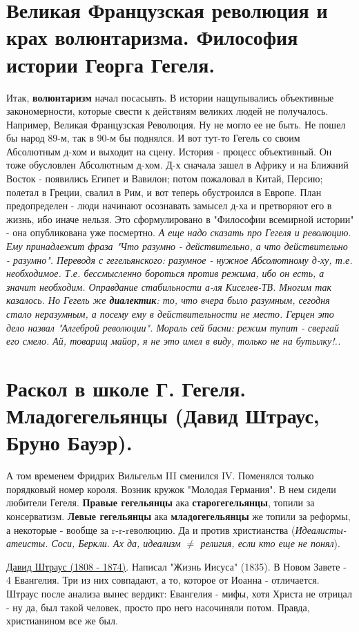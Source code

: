 \section{Великая Французская революция и крах волюнтаризма.  Философия истории Георга Гегеля. }
Итак, \textbf{волюнтаризм} начал посасывть. В истории нащупывались объективные закономерности, которые свести к действиям великих людей не получалось. Например, Великая Французская Революция. Ну не могло ее не быть. Не пошел бы народ 89-м, так в 90-м бы поднялся. И вот тут-то Гегель со своим Абсолютным д-хом и выходит на сцену. История - процесс объективный. Он тоже обусловлен Абсолютным д-хом. Д-х сначала зашел в Африку и на Ближний Восток - появились Египет и Вавилон; потом пожаловал в Китай, Персию; полетал в Греции, свалил в Рим, и вот теперь обустроился в Европе. План предопределен - люди начинают осознавать замысел д-ха и претворяют его в жизнь, ибо иначе нельзя. Это сформулировано в "Философии всемирной истории" - она опубликована уже посмертно. \textit{А еще надо сказать про Гегеля и революцию. Ему принадлежит фраза "Что разумно - действительно, а что действительно - разумно". Переводя с гегельянского: разумное - нужное Абсолютному д-ху, т.е. необходимое. Т.е. бессмысленно бороться против режима, ибо он есть, а значит необходим. Оправдание стабильности а-ля Киселев-ТВ. Многим так казалось. Но Гегель же \textbf{диалектик}: то, что вчера было разумным, сегодня стало неразумным, а посему ему в действительности не место. Герцен это дело назвал "Алгеброй революции". Мораль сей басни: режим тупит - свергай его смело. Ай, товарищ майор, я не это имел в виду, только не на бутылку!..}

\section{Раскол в школе Г. Гегеля. Младогегельянцы (Давид Штраус, Бруно Бауэр).}
А  том временем Фридрих Вильгельм III сменился IV. Поменялся только порядковый номер короля. Возник кружок "Молодая Германия". В нем сидели любители Гегеля. \textbf{Правые гегельянцы} ака \textbf{старогегельянцы}, топили за консерватизм. \textbf{Левые гегельянцы} ака \textbf{младогегельянцы} же топили за реформы, а некоторые - вообще за r-r-rеволюцию. Да и против христианства (\textit{Идеалисты-атеисты. Соси, Беркли. Ах да, идеализм $\neq$ религия, если кто еще не понял}).

\underline{Давид Штраус (1808 - 1874)}. Написал "Жизнь Иисуса" (1835). В Новом Завете - 4 Евангелия. Три из них совпадают, а то, которое от Иоанна - отличается. Штраус после анализа вынес вердикт: Евангелия - мифы, хотя Христа не отрицал - ну да, был такой человек, просто про него насочиняли потом. Правда, христианином все же был.

